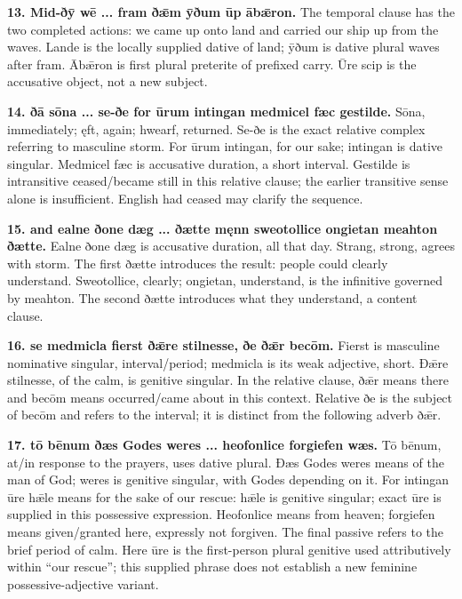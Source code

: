 \textbf{13. Mid-ðȳ wē ... fram ðǣm ȳðum ūp ābǣron.} The temporal clause has the two completed actions: we came up onto land and carried our ship up from the waves. Lande is the locally supplied dative of land; ȳðum is dative plural waves after fram. Ābǣron is first plural preterite of prefixed carry. Ūre scip is the accusative object, not a new subject.

\textbf{14. ðā sōna ... se-ðe for ūrum intingan medmicel fæc gestilde.} Sōna, immediately; ęft, again; hwearf, returned. Se-ðe is the exact relative complex referring to masculine storm. For ūrum intingan, for our sake; intingan is dative singular. Medmicel fæc is accusative duration, a short interval. Gestilde is intransitive ceased/\allowbreak{}became still in this relative clause; the earlier transitive sense alone is insufficient. English had ceased may clarify the sequence.

\textbf{15. and ealne ðone dæg ... ðætte męnn sweotollice ongietan meahton ðætte.} Ealne ðone dæg is accusative duration, all that day. Strang, strong, agrees with storm. The first ðætte introduces the result: people could clearly understand. Sweotollice, clearly; ongietan, understand, is the infinitive governed by meahton. The second ðætte introduces what they understand, a content clause.

\textbf{16. se medmicla fierst ðǣre stilnesse, ðe ðǣr becōm.} Fierst is masculine nominative singular, interval/\allowbreak{}period; medmicla is its weak adjective, short. Ðǣre stilnesse, of the calm, is genitive singular. In the relative clause, ðǣr means there and becōm means occurred/\allowbreak{}came about in this context. Relative ðe is the subject of becōm and refers to the interval; it is distinct from the following adverb ðǣr.

\textbf{17. tō bēnum ðæs Godes weres ... heofonlice forgiefen wæs.} Tō bēnum, at/\allowbreak{}in response to the prayers, uses dative plural. Ðæs Godes weres means of the man of God; weres is genitive singular, with Godes depending on it. For intingan ūre hǣle means for the sake of our rescue: hǣle is genitive singular; exact ūre is supplied in this possessive expression. Heofonlice means from heaven; forgiefen means given/\allowbreak{}granted here, expressly not forgiven. The final passive refers to the brief period of calm. Here ūre is the first-person plural genitive used attributively within “our rescue”; this supplied phrase does not establish a new feminine possessive-adjective variant.

